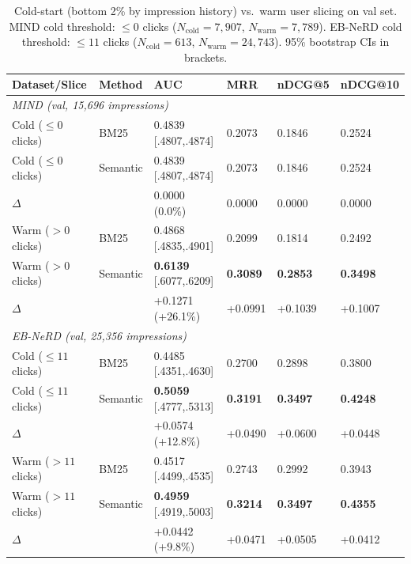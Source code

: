 \documentclass[11pt,a4paper]{article}
\begin{document}
\begin{table}[h!]
  \centering
  \caption{Cold-start (bottom 2\% by impression history) vs.\ warm user slicing on val set.
  MIND cold threshold: $\leq 0$ clicks ($N_{\text{cold}}{=}7{,}907$, $N_{\text{warm}}{=}7{,}789$).
  EB-NeRD cold threshold: $\leq 11$ clicks ($N_{\text{cold}}{=}613$, $N_{\text{warm}}{=}24{,}743$).
  95\% bootstrap CIs in brackets.}
  \label{tab:cold_warm}
  \small
  \setlength{\tabcolsep}{3pt}
  \begin{tabularx}{\linewidth}{l l X X X X}
    \toprule
    \textbf{Dataset/Slice} & \textbf{Method} & \textbf{AUC} & \textbf{MRR} & \textbf{nDCG@5} & \textbf{nDCG@10} \\
    \midrule
    \multicolumn{6}{l}{\textit{MIND (val, 15,696 impressions)}} \\
    Cold ($\leq 0$ clicks) & BM25     & 0.4839 [.4807,.4874] & 0.2073 & 0.1846 & 0.2524 \\
    Cold ($\leq 0$ clicks) & Semantic  & 0.4839 [.4807,.4874] & 0.2073 & 0.1846 & 0.2524 \\
    \quad\small$\Delta$   &           & 0.0000 (0.0\%)       & 0.0000 & 0.0000 & 0.0000 \\
    Warm ($> 0$ clicks)   & BM25     & 0.4868 [.4835,.4901] & 0.2099 & 0.1814 & 0.2492 \\
    Warm ($> 0$ clicks)   & Semantic  & \textbf{0.6139} [.6077,.6209] & \textbf{0.3089} & \textbf{0.2853} & \textbf{0.3498} \\
    \quad\small$\Delta$   &           & +0.1271 (+26.1\%)    & +0.0991 & +0.1039 & +0.1007 \\
    \midrule
    \multicolumn{6}{l}{\textit{EB-NeRD (val, 25,356 impressions)}} \\
    Cold ($\leq 11$ clicks) & BM25    & 0.4485 [.4351,.4630] & 0.2700 & 0.2898 & 0.3800 \\
    Cold ($\leq 11$ clicks) & Semantic & \textbf{0.5059} [.4777,.5313] & \textbf{0.3191} & \textbf{0.3497} & \textbf{0.4248} \\
    \quad\small$\Delta$   &           & +0.0574 (+12.8\%)    & +0.0490 & +0.0600 & +0.0448 \\
    Warm ($> 11$ clicks)  & BM25    & 0.4517 [.4499,.4535] & 0.2743 & 0.2992 & 0.3943 \\
    Warm ($> 11$ clicks)  & Semantic & \textbf{0.4959} [.4919,.5003] & \textbf{0.3214} & \textbf{0.3497} & \textbf{0.4355} \\
    \quad\small$\Delta$   &           & +0.0442 (+9.8\%)     & +0.0471 & +0.0505 & +0.0412 \\
    \bottomrule
  \end{tabularx}
\end{table}
\end{document}
